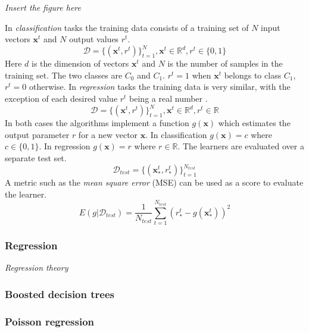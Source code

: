 \documentclass[english,12pt,a4paper,pdftex,sci,utf8]{aaltothesis}
\newcommand{\nyi}[1]{\colorbox{nyibg}{\textcolor{nyitext}{\emph{#1}}}}
\begin{document}
\nyi{Insert the figure here}

In \emph{classification} tasks the training data consists of a training set of $N$ input vectors $\mathbf{x}^t$ and $N$ output values $r^t$.
$$\mathcal{D} = \{(\mathbf{x}^t, r^t)\}_{t=1}^N, \mathbf{x}^t \in \mathbb{R}^d, r^t \in \{0, 1\} $$
Here $d$ is the dimension of vectors $\mathbf{x}^t$ and $N$ is the number of samples in the training set.
The two classes are $C_0$ and $C_1$. $r^t = 1$ when $\mathbf{x}^t$ belongs to class $C_1$, $r^t = 0$ otherwise. \cite{alpaydin}
In \emph{regression} tasks the training data is very similar, with the exception of each desired value $r^t$ being a real number \cite{alpaydin}.
$$\mathcal{D} = \{(\mathbf{x}^t, r^t)\}_{t=1}^N, \mathbf{x}^t \in \mathbb{R}^d, r^t \in \mathbb{R}$$
In both cases the algorithms implement a function $g(\mathbf{x})$ which estimates the output parameter $r$ for a new vector $\mathbf{x}$. 
In classification $g(\mathbf{x}) = c$ where $c \in \{0, 1\}$. 
In regression $g(\mathbf{x}) = r$ where $r \in \mathbb{R}$.
The learners are evaluated over a separate test set.
$$\mathcal{D}_{test} = \{ (\mathbf{x}_*^t , r_*^t) \}_{t=1}^{N_{test}}$$
A metric such as the \emph{mean square error} (MSE) can be used as a score to evaluate the learner. \cite{alpaydin}
$$E(g | \mathcal{D}_{test}) = \frac{1}{N_{test}} \sum_{t=1}^{N_{test}} (r_*^t - g(\mathbf{x}_*^t))^2$$

\subsubsection{Regression}

\nyi{Regression theory}



\subsubsection{Boosted decision trees}




\subsubsection{Poisson regression}
\end{document}
